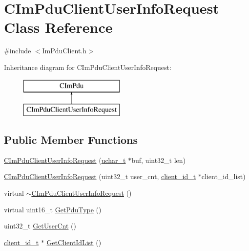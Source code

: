 \hypertarget{class_c_im_pdu_client_user_info_request}{}\section{C\+Im\+Pdu\+Client\+User\+Info\+Request Class Reference}
\label{class_c_im_pdu_client_user_info_request}


{\ttfamily \#include $<$Im\+Pdu\+Client.\+h$>$}

Inheritance diagram for C\+Im\+Pdu\+Client\+User\+Info\+Request\+:\begin{figure}[H]
\begin{center}
\leavevmode
\includegraphics[height=2.000000cm]{class_c_im_pdu_client_user_info_request}
\end{center}
\end{figure}
\subsection*{Public Member Functions}
\begin{DoxyCompactItemize}
\item 
\hyperlink{class_c_im_pdu_client_user_info_request_ae3f80e2c46418b8e12b907820774c3d4}{C\+Im\+Pdu\+Client\+User\+Info\+Request} (\hyperlink{base_2ostype_8h_a124ea0f8f4a23a0a286b5582137f0b8d}{uchar\+\_\+t} $\ast$buf, uint32\+\_\+t len)
\item 
\hyperlink{class_c_im_pdu_client_user_info_request_a274150acaf1dff962fe97aff158b2197}{C\+Im\+Pdu\+Client\+User\+Info\+Request} (uint32\+\_\+t user\+\_\+cnt, \hyperlink{structclient__id__t}{client\+\_\+id\+\_\+t} $\ast$client\+\_\+id\+\_\+list)
\item 
virtual \hyperlink{class_c_im_pdu_client_user_info_request_af2c2670b4bcf4f473b1c686c9802a109}{$\sim$\+C\+Im\+Pdu\+Client\+User\+Info\+Request} ()
\item 
virtual uint16\+\_\+t \hyperlink{class_c_im_pdu_client_user_info_request_a6120cdc12201ef3bb4f54c589ba3ceac}{Get\+Pdu\+Type} ()
\item 
uint32\+\_\+t \hyperlink{class_c_im_pdu_client_user_info_request_a8a1852a4f46b6807031d847ba020b185}{Get\+User\+Cnt} ()
\item 
\hyperlink{structclient__id__t}{client\+\_\+id\+\_\+t} $\ast$ \hyperlink{class_c_im_pdu_client_user_info_request_a2407749d80792f29fc01cdd142f09e11}{Get\+Client\+Id\+List} ()
\end{DoxyCompactItemize}
